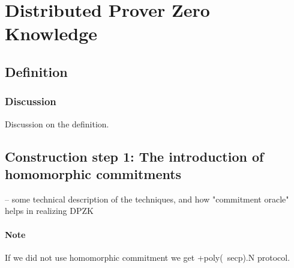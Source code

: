 \section{Distributed Prover Zero Knowledge}

\subsection{Definition}

\subsubsection{Discussion}
Discussion on the definition.

\subsection{Construction step 1: The introduction of homomorphic commitments}

 -- some technical description of the techniques, and how "commitment oracle"
helps in realizing DPZK

\paragraph{Note} If we did not use homomorphic commitment we get +poly(\ secp).N protocol.
